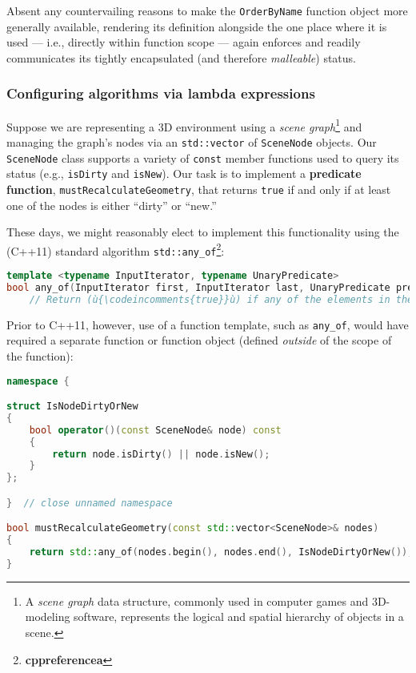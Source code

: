 \noindent Absent any countervailing reasons to make the \texttt{OrderByName}
function object more generally available, rendering its definition
alongside the one place where it is used --- i.e., directly within
function scope --- again enforces and readily communicates its tightly
encapsulated (and therefore \emph{malleable}) status.

\subsubsection[Configuring algorithms via lambda expressions]{Configuring algorithms via lambda expressions}\label{configuring-algorithms-via-lambda-expressions}

Suppose we are representing a 3D environment using a \emph{scene
graph}{\cprotect\footnote{A \emph{scene graph} data structure, commonly
used in computer games and 3D-modeling software, represents the
  logical and spatial hierarchy of objects in a scene.}} and managing
the graph's nodes via an \texttt{std::vector} of \texttt{SceneNode}
objects. Our \texttt{SceneNode} class supports a variety of
\texttt{const} member functions used to query its status (e.g.,
\texttt{isDirty} and \texttt{isNew}). Our task is to implement a
\textbf{predicate function}, \texttt{mustRecalculateGeometry}, that
returns \texttt{true} if and only if at least one of the nodes is either
``dirty'' or ``new.''

These days, we might reasonably elect to implement this functionality
using the (C++11) standard algorithm
\texttt{std::any\_of}{\cprotect\footnote{\textbf{cppreferencea}}}:

\begin{lstlisting}[language=C++]
template <typename InputIterator, typename UnaryPredicate>
bool any_of(InputIterator first, InputIterator last, UnaryPredicate pred);
    // Return (ù{\codeincomments{true}}ù) if any of the elements in the range satisfies (ù{\codeincomments{pred}}ù).
\end{lstlisting}
    
\noindent Prior to C++11, however, use of a function template, such as
\texttt{any\_of}, would have required a separate function or
function object (defined \emph{outside} of the scope of the function):

\begin{lstlisting}[language=C++]
namespace {

struct IsNodeDirtyOrNew
{
    bool operator()(const SceneNode& node) const
    {
        return node.isDirty() || node.isNew();
    }
};

}  // close unnamed namespace

bool mustRecalculateGeometry(const std::vector<SceneNode>& nodes)
{
    return std::any_of(nodes.begin(), nodes.end(), IsNodeDirtyOrNew());
}
\end{lstlisting}
    
